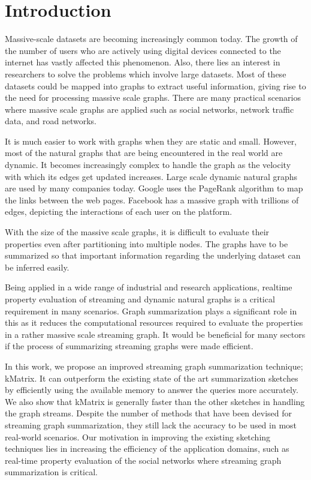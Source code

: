 \section{Introduction}

Massive-scale datasets are becoming increasingly common today. The growth of the number of users who are actively using digital devices connected to the internet has vastly affected this phenomenon. Also, there lies an interest in researchers to solve the problems which involve large datasets. Most of these datasets could be mapped into graphs to extract useful information, giving rise to the need for processing massive scale graphs. There are many practical scenarios where massive scale graphs are applied such as social networks, network traffic data, and road networks.

It is much easier to work with graphs when they are static and small. However, most of the natural graphs that are being encountered in the real world are dynamic. It becomes increasingly complex to handle the graph as the velocity with which its edges get updated increases. Large scale dynamic natural graphs are used by many companies today. Google uses the PageRank algorithm\cite{brin_anatomy_1998, page_pagerank_nodate} to map the links between the web pages. Facebook has a massive graph with trillions of edges\cite{ching_one_2015}, depicting the interactions of each user on the platform.

With the size of the massive scale graphs, it is difficult to evaluate their properties even after partitioning into multiple nodes. The graphs have to be summarized so that important information regarding the underlying dataset can be inferred easily.

Being applied in a wide range of industrial and research applications, realtime property evaluation of streaming and dynamic natural graphs is a critical requirement in many scenarios. Graph summarization plays a significant role in this as it reduces the computational resources required to evaluate the properties in a rather massive scale streaming graph. It would be beneficial for many sectors if the process of summarizing streaming graphs were made efficient.

In this work, we propose an improved streaming graph summarization technique; kMatrix. It can outperform the existing state of the art summarization sketches by efficiently using the available memory to answer the queries more accurately. We also show that kMatrix is generally faster than the other sketches in handling the graph streams. Despite the number of methods that have been devised for streaming graph summarization, they still lack the accuracy to be used in most real-world scenarios\cite{kumarage_efficient_2017}. Our motivation in improving the existing sketching techniques lies in increasing the efficiency of the application domains, such as real-time property evaluation of the social networks where streaming graph summarization is critical. 